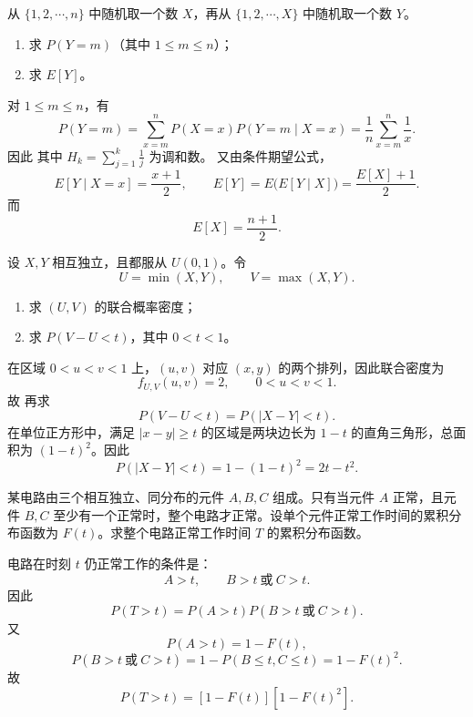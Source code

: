 ﻿

\begin{question}
从 $\{1,2,\cdots,n\}$ 中随机取一个数 $X$，再从 $\{1,2,\cdots,X\}$ 中随机取一个数 $Y$。
\begin{enumerate}
\item 求 $P(Y=m)$（其中 $1\le m\le n$）；
\item 求 $E[Y]$。
\end{enumerate}
\begin{solution}
对 $1\le m\le n$，有
\[
P(Y=m)=\sum_{x=m}^{n}P(X=x)P(Y=m\mid X=x)
=\frac1n\sum_{x=m}^{n}\frac1x.
\]
因此
其中 $H_k=\sum_{j=1}^k\frac1j$ 为调和数。
又由条件期望公式，
\[
E[Y\mid X=x]=\frac{x+1}{2},
\qquad
E[Y]=E\bigl(E[Y\mid X]\bigr)=\frac{E[X]+1}{2}.
\]
而
\[
E[X]=\frac{n+1}{2}.
\]
\end{solution}
\end{question}

\begin{question}
设 $X,Y$ 相互独立，且都服从 $U(0,1)$。令
\[
U=\min(X,Y),\qquad V=\max(X,Y).
\]
\begin{enumerate}
\item 求 $(U,V)$ 的联合概率密度；
\item 求 $P(V-U<t)$，其中 $0<t<1$。
\end{enumerate}
\begin{solution}
在区域 $0<u<v<1$ 上，$(u,v)$ 对应 $(x,y)$ 的两个排列，因此联合密度为
\[
f_{U,V}(u,v)=2,
\qquad 0<u<v<1.
\]
故
再求
\[
P(V-U<t)=P(|X-Y|<t).
\]
在单位正方形中，满足 $|x-y|\ge t$ 的区域是两块边长为 $1-t$ 的直角三角形，总面积为 $(1-t)^2$。因此
\[
P(|X-Y|<t)=1-(1-t)^2=2t-t^2.
\]
\end{solution}
\end{question}

\begin{question}
某电路由三个相互独立、同分布的元件 $A,B,C$ 组成。只有当元件 $A$ 正常，且元件 $B,C$ 至少有一个正常时，整个电路才正常。设单个元件正常工作时间的累积分布函数为 $F(t)$。求整个电路正常工作时间 $T$ 的累积分布函数。
\begin{solution}
电路在时刻 $t$ 仍正常工作的条件是：
\[
A>t,\qquad B>t\ \text{或}\ C>t.
\]
因此
\[
P(T>t)=P(A>t)P(B>t\ \text{或}\ C>t).
\]
又
\[
P(A>t)=1-F(t),
\]
\[
P(B>t\ \text{或}\ C>t)=1-P(B\le t,C\le t)=1-F(t)^2.
\]
故
\[
P(T>t)=[1-F(t)][1-F(t)^2].
\]
\end{solution}
\end{question}

